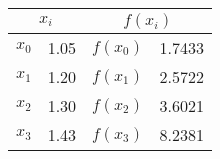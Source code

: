\documentclass[12pt,class=book,crop=false]{standalone}
\begin{document}
\begin{center}
    \begin{tabular}{r@{ = }S[table-format=1.3]r@{ = }S[table-format=1.4]}
        \toprule
         &                          \\\midrule
        \(  x_0\)                      & 1.05                              & \(  f(x_0)\) & 1.7433 \\
        \(  x_1 \)                     & 1.20                              & \(  f(x_1)\) & 2.5722 \\
        \(  x_2 \)                     & 1.30                              & \(  f(x_2)\) & 3.6021 \\
        \(  x_3 \)                     & 1.43                              & \(  f(x_3)\) & 8.2381 \\\bottomrule
    \end{tabular}
\end{center}
\end{document}
